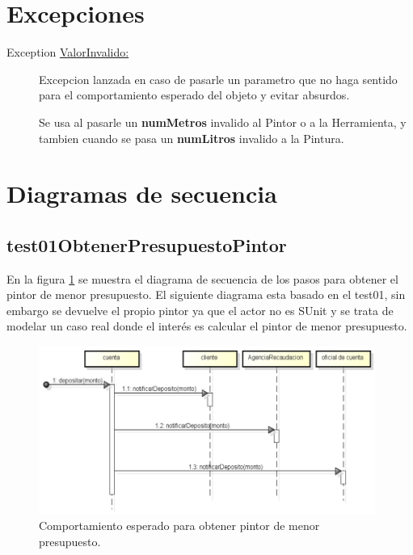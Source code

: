 \documentclass[titlepage,a4paper]{article}
\begin{document}
\section{Excepciones}\label{sec:excepciones}
\begin{description}
\item[Exception \underline{ValorInvalido:}] Excepcion lanzada en caso de pasarle un parametro que no haga sentido para el comportamiento esperado del objeto
y evitar absurdos.

Se usa al pasarle un \textbf{numMetros} invalido al Pintor o a la Herramienta, y tambien cuando se pasa un \textbf{numLitros} invalido a la Pintura.
\end{description}


\section{Diagramas de secuencia}\label{sec:diagramasdesecuencia}

\subsection{test01ObtenerPresupuestoPintor}
En la figura \ref{fig:seq01} se muestra el diagrama de secuencia de los pasos para obtener el pintor de menor presupuesto.
El siguiente diagrama esta basado en el test01, sin embargo se devuelve el propio pintor ya que el actor no es SUnit y se 
trata de modelar un caso real donde el interés es calcular el pintor de menor presupuesto.

\begin{figure}[H]
\centering
\includegraphics[width=0.98\textwidth]{diagrama_secuencia01.png} 
\caption{\label{fig:seq01}Comportamiento esperado para obtener pintor de menor presupuesto.}
\end{figure}
\end{document}

